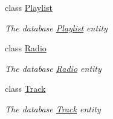\begin{DoxyCompactItemize}
class \hyperlink{class_d_t_o_1_1_entity_1_1_playlist}{Playlist}
\begin{DoxyCompactList}\small\item\em The database \hyperlink{class_d_t_o_1_1_entity_1_1_playlist}{Playlist} entity \end{DoxyCompactList}\item 
class \hyperlink{class_d_t_o_1_1_entity_1_1_radio}{Radio}
\begin{DoxyCompactList}\small\item\em The database \hyperlink{class_d_t_o_1_1_entity_1_1_radio}{Radio} entity \end{DoxyCompactList}\item 
class \hyperlink{class_d_t_o_1_1_entity_1_1_track}{Track}
\begin{DoxyCompactList}\small\item\em The database \hyperlink{class_d_t_o_1_1_entity_1_1_track}{Track} entity \end{DoxyCompactList}\end{DoxyCompactItemize}
